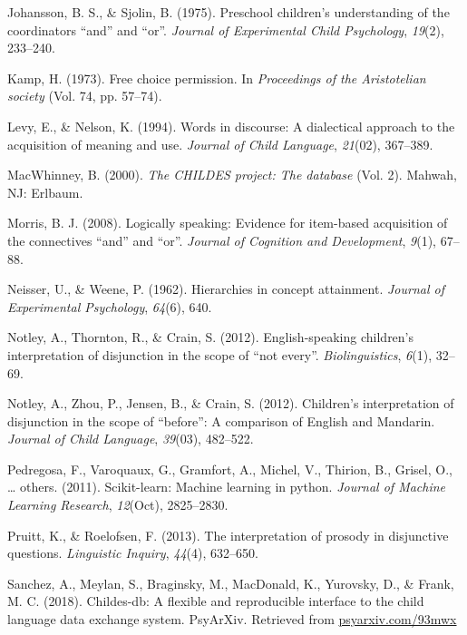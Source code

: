 \documentclass[floatsintext,man]{apa6}
\theoremstyle{definition}
\theoremstyle{definition}
\theoremstyle{definition}
\theoremstyle{remark}
\begin{document}
\hypertarget{ref-johansson1975preschool}{}
Johansson, B. S., \& Sjolin, B. (1975). Preschool children's
understanding of the coordinators ``and'' and ``or''. \emph{Journal of
Experimental Child Psychology}, \emph{19}(2), 233--240.

\hypertarget{ref-kamp1973free}{}
Kamp, H. (1973). Free choice permission. In \emph{Proceedings of the
Aristotelian society} (Vol. 74, pp. 57--74).

\hypertarget{ref-levy1994words}{}
Levy, E., \& Nelson, K. (1994). Words in discourse: A dialectical
approach to the acquisition of meaning and use. \emph{Journal of Child
Language}, \emph{21}(02), 367--389.

\hypertarget{ref-macwhinney2000childes}{}
MacWhinney, B. (2000). \emph{The CHILDES project: The database} (Vol.
2). Mahwah, NJ: Erlbaum.

\hypertarget{ref-morris2008logically}{}
Morris, B. J. (2008). Logically speaking: Evidence for item-based
acquisition of the connectives ``and'' and ``or''. \emph{Journal of
Cognition and Development}, \emph{9}(1), 67--88.

\hypertarget{ref-neisser1962hierarchies}{}
Neisser, U., \& Weene, P. (1962). Hierarchies in concept attainment.
\emph{Journal of Experimental Psychology}, \emph{64}(6), 640.

\hypertarget{ref-notley2012notevery}{}
Notley, A., Thornton, R., \& Crain, S. (2012). English-speaking
children's interpretation of disjunction in the scope of ``not every''.
\emph{Biolinguistics}, \emph{6}(1), 32--69.

\hypertarget{ref-notley2012children}{}
Notley, A., Zhou, P., Jensen, B., \& Crain, S. (2012). Children's
interpretation of disjunction in the scope of ``before'': A comparison
of English and Mandarin. \emph{Journal of Child Language},
\emph{39}(03), 482--522.

\hypertarget{ref-pedregosa2011scikit}{}
Pedregosa, F., Varoquaux, G., Gramfort, A., Michel, V., Thirion, B.,
Grisel, O., \ldots{} others. (2011). Scikit-learn: Machine learning in
python. \emph{Journal of Machine Learning Research}, \emph{12}(Oct),
2825--2830.

\hypertarget{ref-pruitt2013interpretation}{}
Pruitt, K., \& Roelofsen, F. (2013). The interpretation of prosody in
disjunctive questions. \emph{Linguistic Inquiry}, \emph{44}(4),
632--650.

\hypertarget{ref-sanchez2018childes}{}
Sanchez, A., Meylan, S., Braginsky, M., MacDonald, K., Yurovsky, D., \&
Frank, M. C. (2018). Childes-db: A flexible and reproducible interface
to the child language data exchange system. PsyArXiv. Retrieved from
\url{psyarxiv.com/93mwx}
\end{document}
